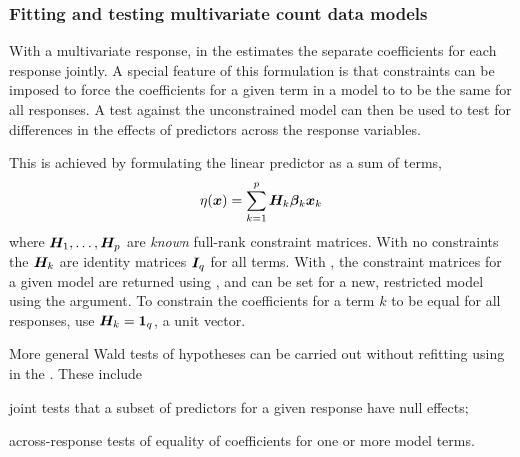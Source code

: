 \documentclass[11pt]{book}\usepackage[]{graphicx}\usepackage[]{color}
\begin{document}
\subsubsection{Fitting and testing multivariate count data models}

With a multivariate response,  in the  estimates the separate
coefficients for each response jointly.  A special feature of this formulation is that
constraints can be imposed to force the coefficients for a given term in a model to
to be the same for all responses.  A \LR test against the unconstrained model can then
be used to test for differences in the effects of predictors across the response variables.

This is achieved by formulating the linear predictor as a sum of terms,
\begin{equation*}
\eta (\bm{x}) = \sum_{k=1}^p  \bm{H}_k  \bm{\beta}_k \bm{x}_k
\end{equation*}
where $\bm{H}_1, \dots , \bm{H}_p$ are \emph{known} full-rank constraint matrices.
With no constraints the $\bm{H}_k$ are identity matrices $\bm{I}_q$ for all terms.
With , the constraint matrices for a given model are returned using
, and can be set for a new, restricted model using the 
argument. To constrain the coefficients for a term $k$ to be equal for all responses,
use $\bm{H}_k = \bm{1}_q$, a unit vector.

More general Wald tests of hypotheses can be carried out without refitting using 
in the .  These include
\begin{seriate}
  \item joint tests that a subset of predictors for a given response have null effects;
  \item across-response tests of equality of coefficients for one or more model terms.
\end{seriate}
\end{document}

